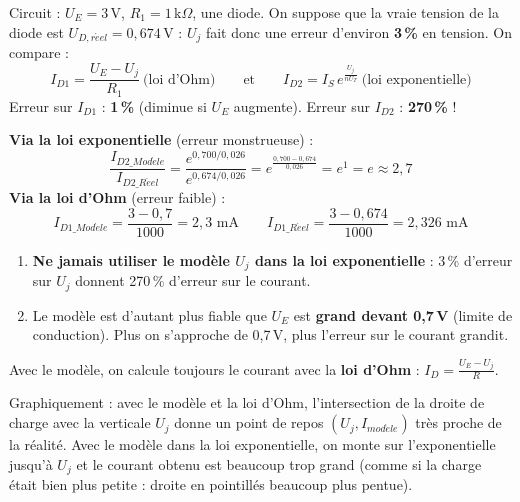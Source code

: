 
\begin{exbox}[title={Deux façons de calculer le courant avec $U_D = U_j = 0{,}7$\,V}]
Circuit : $U_E = 3$\,V, $R_1 = 1$\,k$\Omega$, une diode. On suppose que la vraie tension de
la diode est $U_{D,r\acute eel} = 0{,}674$\,V : $U_j$ fait donc une erreur d'environ
\textbf{3\,\%} en tension. On compare :
\[ I_{D1} = \frac{U_E - U_j}{R_1} \ \text{(loi d'Ohm)} \qquad\text{et}\qquad
   I_{D2} = I_S\,e^{\frac{U_j}{nU_T}} \ \text{(loi exponentielle)} \]
Erreur sur $I_{D1}$ : \textbf{1\,\%} (diminue si $U_E$ augmente). Erreur sur $I_{D2}$ :
\textbf{270\,\%} !
\end{exbox}


\begin{exbox}[title=Le calcul]
\textbf{Via la loi exponentielle} (erreur monstrueuse) :
\[ \frac{I_{D2\_Mod\grave ele}}{I_{D2\_R\acute eel}} = \frac{e^{0{,}700/0{,}026}}{e^{0{,}674/0{,}026}}
   = e^{\frac{0{,}700 - 0{,}674}{0{,}026}} = e^1 = e \approx 2{,}7 \]
\textbf{Via la loi d'Ohm} (erreur faible) :
\[ I_{D1\_Mod\grave ele} = \frac{3 - 0{,}7}{1000} = 2{,}3\text{ mA} \qquad
   I_{D1\_R\acute eel} = \frac{3 - 0{,}674}{1000} = 2{,}326\text{ mA} \]
\end{exbox}

\begin{warnbox}[title=Les deux remarques à retenir]
\begin{enumerate}
  \item \textbf{Ne jamais utiliser le modèle $U_j$ dans la loi exponentielle} : 3\,\%
        d'erreur sur $U_j$ donnent 270\,\% d'erreur sur le courant.
  \item Le modèle est d'autant plus fiable que $U_E$ est \textbf{grand devant 0,7\,V}
        (limite de conduction). Plus on s'approche de 0,7\,V, plus l'erreur sur le courant
        grandit.
\end{enumerate}
Avec le modèle, on calcule toujours le courant avec la \textbf{loi d'Ohm} :
$I_D = \frac{U_E - U_j}{R}$.
\end{warnbox}


Graphiquement : avec le modèle et la loi d'Ohm, l'intersection de la droite de charge avec la
verticale $U_j$ donne un point de repos $(U_j, I_{mod\grave ele})$ très proche de la
réalité. Avec le modèle dans la loi exponentielle, on monte sur l'exponentielle jusqu'à $U_j$
et le courant obtenu est beaucoup trop grand (comme si la charge était bien plus petite :
droite en pointillés beaucoup plus pentue).

